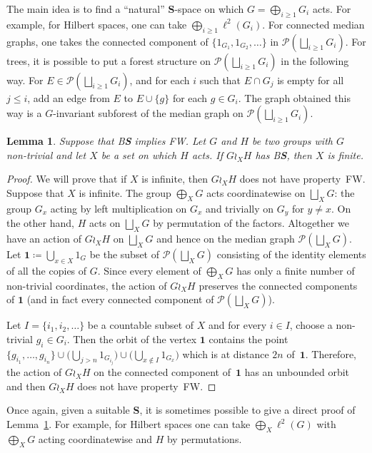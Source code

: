\documentclass[a4paper]{article}
\newtheorem{lem}{Lemma}[section]
\theoremstyle{definition}
\newcommand*{\category}[1]{\textbf{#1}}
\newcommand*{\CatS}{\category{S}}
\newcommand*{\BS}{B\textbf{S}}
\newcommand*{\FW}{FW}
\newcommand*{\powerset}[1]{\mathcal P(#1)}
\begin{document}
The main idea is to find a ``natural'' \CatS-space on which $G=\bigoplus_{i\geq 1}G_i$ acts. For example, for Hilbert spaces, one can take $\bigoplus_{i\geq 1}\ell^2(G_i)$. For connected median graphs, one takes the connected component of $\{1_{G_1},1_{G_2},\dots\}$ in $\powerset{\bigsqcup_{i\geq 1} G_i}$.
For trees, it is possible to put a forest structure on $\powerset{\bigsqcup_{i\geq 1} G_i}$ in the following way.
For $E\in\powerset{\bigsqcup_{i\geq 1} G_i}$, and for each $i$ such that $E\cap G_j$ is empty for all $j\leq i$, add an edge from $E$ to $E\cup\{g\}$ for each $g\in G_i$. The graph obtained this way is a $G$-invariant subforest of the median graph on $\powerset{\bigsqcup_{i\geq 1} G_i}$.
%
%
\begin{lem}\label{Lemma:XFinite}
Suppose that \BS{} implies \FW.
Let $G$ and $H$ be two groups with $G$ non-trivial and let $X$ be a set on which $H$ acts.
If $G\wr_XH$ has \BS, then $X$ is finite.
\end{lem}
\begin{proof}
We will prove that if $X$ is infinite, then $G\wr_XH$ does not have property~\FW. Suppose that $X$ is infinite.
The group $\bigoplus_XG$ acts coordinatewise on  $\bigsqcup_XG$: the group $G_x$ acting by left multiplication on $G_x$ and trivially on $G_y$ for $y\neq x$. On the other hand, $H$ acts on $\bigsqcup_XG$ by permutation of the factors.
Altogether we have an action of $G\wr_XH$ on $\bigsqcup_XG$ and hence on the median graph $\powerset{\bigsqcup_XG}$.
Let $\mathbf 1\coloneqq\bigcup_{x\in X} 1_{G}$ be the subset of $\powerset{\bigsqcup_XG}$ consisting of the identity elements of all the copies of $G$.
Since every element of $\bigoplus_XG$ has only a finite number of non-trivial coordinates, the action of $G\wr_XH$ preserves the connected components of $\mathbf 1$ (and in fact every connected component of $\powerset{\bigsqcup_XG}$).

Let $I=\{i_1,i_2,\dots\}$ be a countable subset of $X$ and for every $i\in I$, choose a non-trivial $g_i\in G_{i}$.
Then the orbit of the vertex $\mathbf 1$ contains the point $\{g_{i_1},\dots, g_{i_n}\}\cup\bigl(\bigcup_{j>n} 1_{G_{i_j}}\bigr)\cup\bigl(\bigcup_{x\notin I} 1_{G_{x}}\bigr)$ which is at distance $2n$ of~$\mathbf 1$.
Therefore, the action of $G\wr_XH$ on the connected component of~$\mathbf 1$ has an unbounded orbit and then $G\wr_XH$ does not have property~\FW.
\end{proof}
%
%
Once again, given a suitable \CatS, it is sometimes possible to give a direct proof of Lemma~\ref{Lemma:XFinite}.
For example, for Hilbert spaces one can take $\bigoplus_X\ell^2(G)$ with $\bigoplus_XG$ acting coordinatewise and $H$ by permutations.
\end{document}
